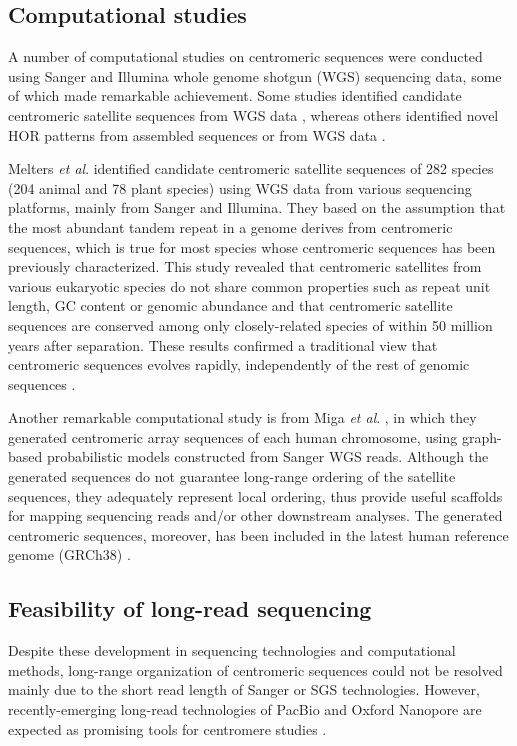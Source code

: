 \subsection*{Computational studies}
  A number of computational studies on centromeric sequences were conducted using Sanger and Illumina whole genome shotgun (WGS) sequencing data, some of which made remarkable achievement. Some studies identified candidate centromeric satellite sequences from WGS data \cite{Alkan2011, Melters2013}, whereas others identified novel HOR patterns from assembled sequences \cite{Rosandic2003} or from WGS data \cite{Alkan2007}.

  Melters \textit{et al}. \cite{Melters2013} identified candidate centromeric satellite sequences of 282 species (204 animal and 78 plant species) using WGS data from various sequencing platforms, mainly from Sanger and Illumina. They based on the assumption that the most abundant tandem repeat in a genome derives from centromeric sequences, which is true for most species whose centromeric sequences has been previously characterized. This study revealed that centromeric satellites from various eukaryotic species do not share common properties such as repeat unit length, GC content or genomic abundance and that centromeric satellite sequences are conserved among only closely-related species of within 50 million years after separation. These results confirmed a traditional view that centromeric sequences evolves rapidly, independently of the rest of genomic sequences \cite{Henikoff2001}.

  Another remarkable computational study is from Miga \textit{et al}. \cite{Miga2014}, in which they generated centromeric array sequences of each human chromosome, using graph-based probabilistic models constructed from Sanger WGS reads. Although the generated sequences do not guarantee long-range ordering of the satellite sequences, they adequately represent local ordering, thus provide useful scaffolds for mapping sequencing reads and/or other downstream analyses. The generated centromeric sequences, moreover, has been included in the latest human reference genome (GRCh38) \cite{GenomeRef2013}.


\subsection*{Feasibility of long-read sequencing}
  Despite these development in sequencing technologies and computational methods, long-range organization of centromeric sequences could not be resolved mainly due to the short read length of Sanger or SGS technologies. However, recently-emerging long-read technologies of PacBio \cite{Eid2009} and Oxford Nanopore \cite{Jain2016} are expected as promising tools for centromere studies \cite{Aldrup-MacDonald2014, Miga2015}.

